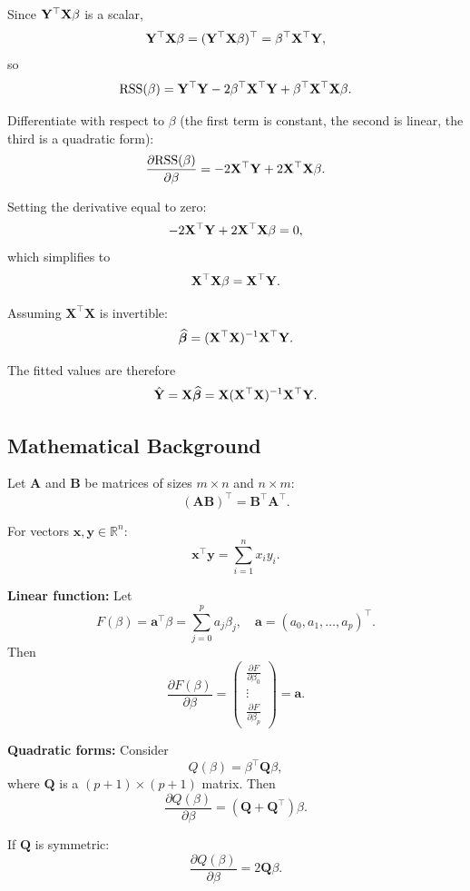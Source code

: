 Since $\mathbf{Y}^{\top}\mathbf{X}\beta$ is a scalar,
\[
\mathbf{Y}^{\top}\mathbf{X}\beta = (\mathbf{Y}^{\top}\mathbf{X}\beta)^{\top} = \beta^{\top}\mathbf{X}^{\top}\mathbf{Y},
\]
so
\[
\mathrm{RSS}(\beta)
= \mathbf{Y}^{\top}\mathbf{Y} - 2\beta^{\top}\mathbf{X}^{\top}\mathbf{Y} + \beta^{\top}\mathbf{X}^{\top}\mathbf{X}\beta.
\]

Differentiate with respect to $\beta$ (the first term is constant, the second is linear, the third is a quadratic form):
\[
\frac{\partial \mathrm{RSS}(\beta)}{\partial \beta}
= -2\mathbf{X}^{\top}\mathbf{Y} + 2\mathbf{X}^{\top}\mathbf{X}\beta.
\]

Setting the derivative equal to zero:
\[
-2\mathbf{X}^{\top}\mathbf{Y} + 2\mathbf{X}^{\top}\mathbf{X}\beta = 0,
\]
which simplifies to
\[
\mathbf{X}^{\top}\mathbf{X}\beta = \mathbf{X}^{\top}\mathbf{Y}.
\]

Assuming $\mathbf{X}^{\top}\mathbf{X}$ is invertible:
\[
\widehat{\boldsymbol{\beta}} = (\mathbf{X}^{\top}\mathbf{X})^{-1}\mathbf{X}^{\top}\mathbf{Y}.
\]

The fitted values are therefore
\[
\hat{\mathbf{Y}} = \mathbf{X}\widehat{\boldsymbol{\beta}} = \mathbf{X}(\mathbf{X}^{\top}\mathbf{X})^{-1}\mathbf{X}^{\top}\mathbf{Y}.
\]

\subsection{Mathematical Background}

Let $\mathbf{A}$ and $\mathbf{B}$ be matrices of sizes $m \times n$ and $n \times m$:
\[
(\mathbf{A}\mathbf{B})^{\top} = \mathbf{B}^{\top}\mathbf{A}^{\top}.
\]

For vectors $\mathbf{x}, \mathbf{y} \in \mathbb{R}^n$:
\[
\mathbf{x}^{\top}\mathbf{y} = \sum_{i=1}^n x_i y_i.
\]

\textbf{Linear function:} Let
\[
F(\beta) = \mathbf{a}^{\top}\beta = \sum_{j=0}^p a_j \beta_j,
\quad
\mathbf{a} = (a_0, a_1, \dots, a_p)^{\top}.
\]
Then
\[
\frac{\partial F(\beta)}{\partial \beta}
=
\begin{pmatrix}
\frac{\partial F}{\partial \beta_0} \\
\vdots \\
\frac{\partial F}{\partial \beta_p}
\end{pmatrix}
= \mathbf{a}.
\]

\textbf{Quadratic forms:} Consider
\[
Q(\beta) = \beta^{\top}\mathbf{Q}\beta,
\]
where $\mathbf{Q}$ is a $(p+1)\times(p+1)$ matrix. Then
\[
\frac{\partial Q(\beta)}{\partial \beta}
= (\mathbf{Q} + \mathbf{Q}^{\top})\beta.
\]

If $\mathbf{Q}$ is symmetric:
\[
\frac{\partial Q(\beta)}{\partial \beta} = 2\mathbf{Q}\beta.
\]

